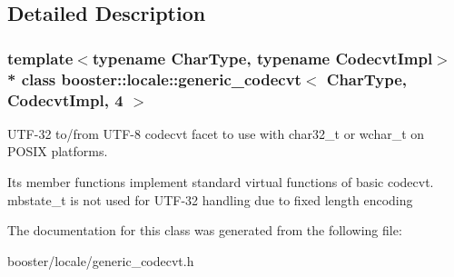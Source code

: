 \subsection{Detailed Description}
\subsubsection*{template$<$typename Char\+Type, typename Codecvt\+Impl$>$\\*
class booster\+::locale\+::generic\+\_\+codecvt$<$ Char\+Type, Codecvt\+Impl, 4 $>$}

U\+T\+F-\/32 to/from U\+T\+F-\/8 codecvt facet to use with char32\+\_\+t or wchar\+\_\+t on P\+O\+S\+IX platforms. 

Its member functions implement standard virtual functions of basic codecvt. mbstate\+\_\+t is not used for U\+T\+F-\/32 handling due to fixed length encoding 

The documentation for this class was generated from the following file\+:\begin{DoxyCompactItemize}
\item 
booster/locale/generic\+\_\+codecvt.\+h\end{DoxyCompactItemize}
